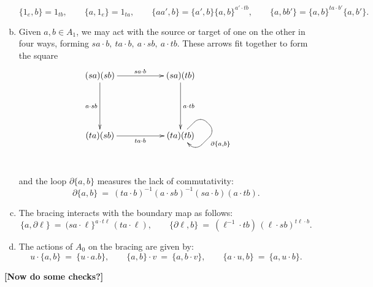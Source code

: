 \begin{enumerate}[(a)]
$$
\{1_e,b\} = 1_{tb},\qquad 
\{a,1_e\} = 1_{ta},\qquad 
\{aa',b\} = \{a',b\}\{a,b\}^{a' \cdot tb},\qquad 
\{a,bb'\} = \{a,b\}^{ta \cdot b'}\{a,b'\}. 
$$
\item
Given $a,b \in A_1$, we may act with the source or target of one 
on the other in four ways, forming 
$sa \cdot b,~ ta \cdot b,~ a \cdot sb,~ a \cdot tb$. 
These arrows fit together to form the square 
$$
\xymatrix{
  (sa)(sb) \ar[rr]^{sa \cdot b}  \ar[dd]_{a \cdot sb} 
    &&  (sa)(tb) \ar[dd]^{a \cdot tb} 
        &&  \\
    &&  &&  \\
  (ta)(sb) \ar[rr]_{ta \cdot b} 
    &&  (ta)(tb) \ar `ur[0,1] `[1,0] `[0,0]^(0.2){\partial\{a,b\}} [0,0]
        &&  \\
    &&  &&  \\
}$$
and the loop $\partial\{a,b\}$ measures the lack of commutativity: 
$$
\partial\{a,b\}~=~(ta \cdot b)^{-1}(a \cdot sb)^{-1}(sa \cdot b)(a \cdot tb). 
$$ 
\item
The bracing interacts with the boundary map as follows: 
$$
\{a,\partial\ell\} ~=~ (sa \cdot \ell\}^{a \cdot t\ell}\,(ta \cdot \ell),
\qquad 
\{\partial\ell,b\} ~=~ (\ell^{-1} \cdot tb)\,(\ell \cdot sb)^{t\ell \cdot b}. 
$$
\item
The actions of $A_0$ on the bracing are given by: 
$$
u \cdot \{a,b\} ~=~ \{u \cdot a.b\}, \qquad 
\{a,b\} \cdot v ~=~ \{a,b \cdot v\}, \qquad 
\{a \cdot u,b\} ~=~ \{a,u \cdot b\}. 
$$
\end{enumerate}

\bigskip\noindent 
{\bf [Now do some checks?]} 


